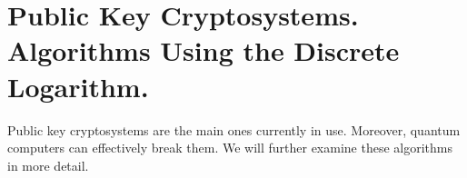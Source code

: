 \chapter{Public Key Cryptosystems. Algorithms Using the Discrete Logarithm.}

Public key cryptosystems are the main ones currently in use. Moreover, quantum computers can effectively break them. We will further examine these algorithms in more detail.





